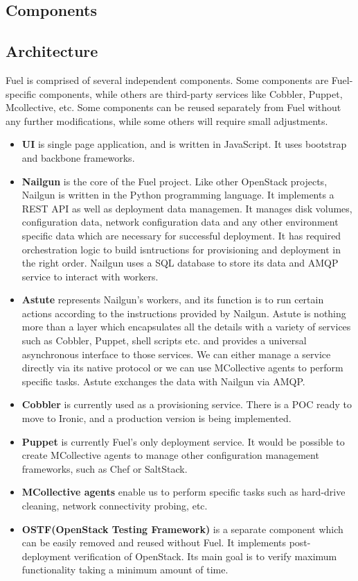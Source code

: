 \documentclass[a4paper, 12pt]{article}
\begin{document}
\subsection{Components}


\subsection{Architecture}
Fuel is comprised of several independent components. Some components are Fuel-specific components, while others are third-party services like Cobbler, Puppet, Mcollective, etc. Some components can be reused separately from Fuel without any further modifications, while some others will require small adjustments.
\begin{itemize}
\item
\textbf{UI} is single page application, and is written in JavaScript. It uses bootstrap and backbone frameworks.
\item
\textbf{Nailgun} is the core of the Fuel project. Like other OpenStack projects, Nailgun is written in the Python programming language. It implements a REST API as well as deployment data managemen. It manages disk volumes, configuration data, network configuration data and any other environment specific data which are necessary for successful deployment. It has required orchestration logic to build isntructions for provisioning and deployment in the right order. Nailgun uses a SQL database to store its data and AMQP service to interact with workers. 
\item
\textbf{Astute} represents Nailgun's workers, and its function is to run certain actions according to the instructions provided by Nailgun. Astute is nothing more than a layer which encapsulates all the details with a variety of services such as Cobbler, Puppet, shell scripts etc. and provides a universal asynchronous interface to those services. We can either manage a service directly via its native protocol or we can use MCollective agents to perform specific tasks. Astute exchanges the data with Nailgun via AMQP. 
\item
\textbf{Cobbler} is currently used as a provisioning service. There is a POC ready to move to Ironic, and a production version is being implemented. 
\item
\textbf{Puppet} is currently Fuel's only deployment service. It would be possible to create MCollective agents to manage other configuration management frameworks, such as Chef or SaltStack. 
\item
\textbf{MCollective agents} enable us to perform specific tasks such as hard-drive cleaning, network connectivity probing, etc. 
\item
\textbf{OSTF(OpenStack Testing Framework)} is a separate component which can be easily removed and reused without Fuel. It implements post-deployment verification of OpenStack. Its main goal is to verify maximum functionality taking a minimum amount of time.
\end{itemize}
\end{document}
